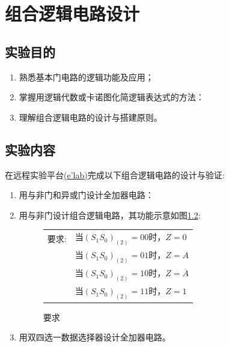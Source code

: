 \documentclass{ctexrep}
\begin{document}
\newpage


\chapter{组合逻辑电路设计}%
\label{cha:组合逻辑电路设计}

\setcounter{page}{1}
\section{实验目的}%
\label{sec:实验目的\arabic{chapter}}

\begin{enumerate}
	\item 熟悉基本门电路的逻辑功能及应用；
	\item 掌握用逻辑代数或卡诺图化简逻辑表达式的方法：
	\item 理解组合逻辑电路的设计与搭建原则。
\end{enumerate}

\section{实验内容}%
\label{sec:实验内容\arabic{chapter}}

在远程实验平台\href{http://192.10.84.32/}{(e'lab)}完成以下组合逻辑电路的设计与验证:

\begin{enumerate}
	\item 用与非门和异或门设计全加器电路：
	\item 用与非门设计组合逻辑电路，其功能示意如图\ref{fig:要求}:
		\begin{figure}[htbp]
			\centering
			\begin{subfigure}[htbp]{.45\linewidth}
				\centering
				
				\label{fig:要求tex}
			\end{subfigure}
			\begin{subtable}[htbp]{.45\linewidth}
				\centering
				\label{tab:要求}
				\begin{tabu}to.9
					\mbox{要求:}&\mbox{当$(S_1S_0)_{(2)}=00$时，$Z=0$}
					\\
								&	\mbox{当$(S_1S_0)_{(2)}=01$时，$Z=A$}
								\\
								&	\mbox{当$(S_1S_0)_{(2)}=10$时，$Z=\overline{A}$}
								\\
								&	\mbox{当$(S_1S_0)_{(2)}=11$时，$Z=1$}
				\end{tabu}
			\end{subtable}
			\captionsetup{labelformat=andtable}
			\caption{要求}
			\label{fig:要求}
		\end{figure}
	\item 用双四选一数据选择器设计全加器电路。
\end{enumerate}
\end{document}
